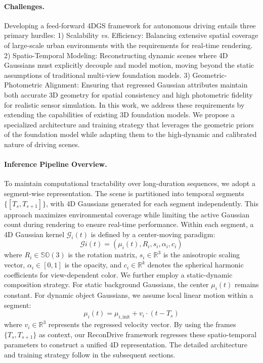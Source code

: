 \paragraph{Challenges.} Developing a feed-forward 4DGS framework for autonomous driving entails three primary hurdles: 
1) Scalability \textit{vs.} Efficiency: Balancing extensive spatial coverage of large-scale urban environments with the requirements for real-time rendering.
2) Spatio-Temporal Modeling: Reconstructing dynamic scenes where 4D Gaussians must explicitly decouple and model motion, moving beyond the static assumptions of traditional multi-view foundation models.
3) Geometric-Photometric Alignment: Ensuring that regressed Gaussian attributes maintain both accurate 3D geometry for spatial consistency and high photometric fidelity for realistic sensor simulation.
In this work, we address these requirements by extending the capabilities of existing 3D foundation models. We propose a specialized architecture and training strategy that leverages the geometric priors of the foundation model while adapting them to the high-dynamic and calibrated nature of driving scenes.

\paragraph{Inference Pipeline Overview.} To maintain computational tractability over long-duration sequences, we adopt a segment-wise representation. The scene is partitioned into temporal segments $\{[T_{s}, T_{s+1}]\}$, with 4D Gaussians generated for each segment independently. This approach maximizes environmental coverage while limiting the active Gaussian count during rendering to ensure real-time performance. Within each segment, a 4D Gaussian kernel $\mathcal{G}_i(t)$ is defined by a center-moving paradigm:\begin{equation}\mathcal{G}i(t) = \left( \mu_{i}(t), R_{i}, s_{i}, \alpha_{i}, c_{i} \right)\end{equation}where $R_{i} \in \mathbb{SO}(3)$ is the rotation matrix, $s_{i} \in \mathbb{R}^3$ is the anisotropic scaling vector, $\alpha_{i} \in [0, 1]$ is the opacity, and $c_{i} \in \mathbb{R}^{k}$ denotes the spherical harmonic coefficients for view-dependent color. We further employ a static-dynamic composition strategy. For static background Gaussians, the center $\mu_{i}(t)$ remains constant. For dynamic object Gaussians, we assume local linear motion within a segment:\begin{equation}\mu_{i}(t) = \mu_{i, \text{init}} + v_{i} \cdot (t - T_s)\end{equation}where $v_i \in \mathbb{R}^3$ represents the regressed velocity vector. By using the frames $\{T_{s}, T_{s+1}\}$ as context, our ReconDrive framework regresses these spatio-temporal parameters to construct a unified 4D representation. The detailed architecture and training strategy follow in the subsequent sections.



